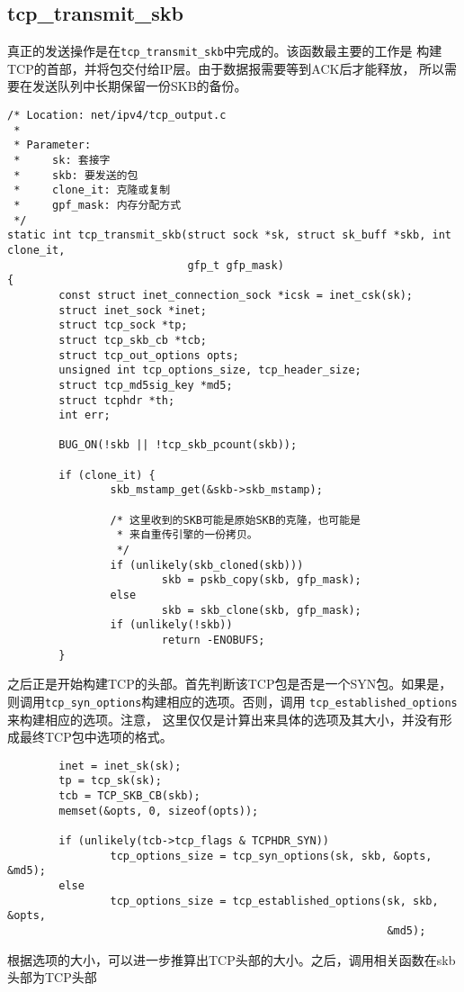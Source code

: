 \subsection{tcp\_transmit\_skb}
真正的发送操作是在\texttt{tcp_transmit_skb}中完成的。该函数最主要的工作是
构建TCP的首部，并将包交付给IP层。由于数据报需要等到ACK后才能释放，
所以需要在发送队列中长期保留一份SKB的备份。
\begin{verbatim}
/* Location: net/ipv4/tcp_output.c
 *
 * Parameter:
 *     sk: 套接字
 *     skb: 要发送的包
 *     clone_it: 克隆或复制
 *     gpf_mask: 内存分配方式
 */
static int tcp_transmit_skb(struct sock *sk, struct sk_buff *skb, int clone_it,
                            gfp_t gfp_mask)
{
        const struct inet_connection_sock *icsk = inet_csk(sk);
        struct inet_sock *inet;
        struct tcp_sock *tp;
        struct tcp_skb_cb *tcb;
        struct tcp_out_options opts;
        unsigned int tcp_options_size, tcp_header_size;
        struct tcp_md5sig_key *md5;
        struct tcphdr *th;
        int err;

        BUG_ON(!skb || !tcp_skb_pcount(skb));

        if (clone_it) {
                skb_mstamp_get(&skb->skb_mstamp);

                /* 这里收到的SKB可能是原始SKB的克隆，也可能是
                 * 来自重传引擎的一份拷贝。
                 */
                if (unlikely(skb_cloned(skb)))
                        skb = pskb_copy(skb, gfp_mask);
                else
                        skb = skb_clone(skb, gfp_mask);
                if (unlikely(!skb))
                        return -ENOBUFS;
        }
\end{verbatim}
之后正是开始构建TCP的头部。首先判断该TCP包是否是一个SYN包。如果是，
则调用\texttt{tcp_syn_options}构建相应的选项。否则，调用
\texttt{tcp_established_options}来构建相应的选项。注意，
这里仅仅是计算出来具体的选项及其大小，并没有形成最终TCP包中选项的格式。
\begin{verbatim}
        inet = inet_sk(sk);
        tp = tcp_sk(sk);
        tcb = TCP_SKB_CB(skb);
        memset(&opts, 0, sizeof(opts));

        if (unlikely(tcb->tcp_flags & TCPHDR_SYN))
                tcp_options_size = tcp_syn_options(sk, skb, &opts, &md5);
        else
                tcp_options_size = tcp_established_options(sk, skb, &opts,
                                                           &md5);
\end{verbatim}
根据选项的大小，可以进一步推算出TCP头部的大小。之后，调用相关函数在skb头部为TCP头部
